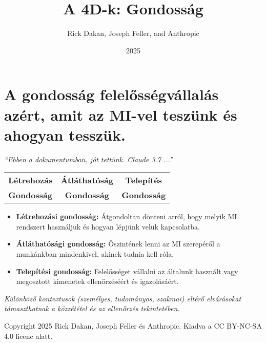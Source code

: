 \documentclass[a4paper, 11pt]{article}
\makeatletter
\renewcommand{\maketitle}{
  \begin{center}
    {\fontsize{22}{26}\bfseries\color{primary}\@title}
    \vspace{0.5em}
    {\color{lightgray}\titlerule[3pt]}
    \vspace{1.5em}
  \end{center}
}
\makeatother
\begin{document}
\title{A 4D-k: Gondosság}
\author{Rick Dakan, Joseph Feller, and Anthropic}
\date{2025}
\maketitle

\section*{A gondosság felelősségvállalás azért, amit az MI-vel teszünk és ahogyan tesszük.}
\textit{“Ebben a dokumentumban, jót tettünk. Claude 3.7 ...”}

\begin{center}
\begin{tabular}{ccc}
\textbf{Létrehozás} & \textbf{Átláthatóság} & \textbf{Telepítés} \\
\textbf{Gondosság} & \textbf{Gondosság} & \textbf{Gondosság} \\
\end{tabular}
\end{center}

\begin{itemize}
    \item \textbf{Létrehozási gondosság:} Átgondoltan dönteni arról, hogy melyik MI rendszert használjuk és hogyan lépjünk velük kapcsolatba.
    \item \textbf{Átláthatósági gondosság:} Őszintének lenni az MI szerepéről a munkánkban mindenkivel, akinek tudnia kell róla.
    \item \textbf{Telepítési gondosság:} Felelősséget vállalni az általunk használt vagy megosztott kimenetek ellenőrzéséért és igazolásáért.
\end{itemize}

\textit{Különböző kontextusok (személyes, tudományos, szakmai) eltérő elvárásokat támaszthatnak a közzététel és az ellenőrzés tekintetében.}

\vspace{\fill}
\begin{center}
    \small{Copyright 2025 Rick Dakan, Joseph Feller és Anthropic. Kiadva a CC BY-NC-SA 4.0 licenc alatt.}
\end{center}
\end{document}
